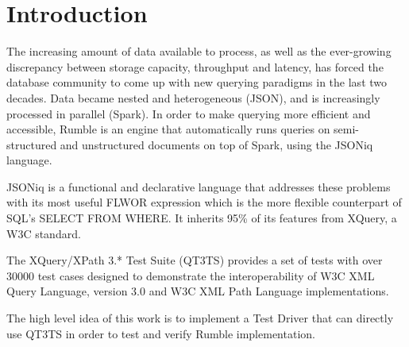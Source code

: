 
\chapter{Introduction}

The increasing amount of data available to process, as well as the ever-growing discrepancy between storage capacity, throughput and latency, has forced the database community to come up with new querying paradigms in the last two decades. Data became nested and heterogeneous (JSON), and is increasingly processed in parallel (Spark). In order to make querying more efficient and accessible, Rumble \cite{muller2020rumble} is an engine that automatically runs queries on semi-structured and unstructured documents on top of Spark, using the JSONiq language. 

JSONiq \cite{JSONIQ}is a functional and declarative language that addresses these problems with its most useful FLWOR expression which is the more flexible counterpart of SQL’s SELECT FROM WHERE. It inherits 95\% of its features from XQuery, a W3C standard.

The XQuery/XPath 3.* Test Suite (QT3TS) \cite{TestSuite} provides a set of tests with over 30000 test cases designed to demonstrate the interoperability of W3C XML Query Language, version 3.0 and W3C XML Path Language implementations.

The high level idea of this work is to implement a Test Driver that can directly use QT3TS in order to test and verify Rumble implementation.